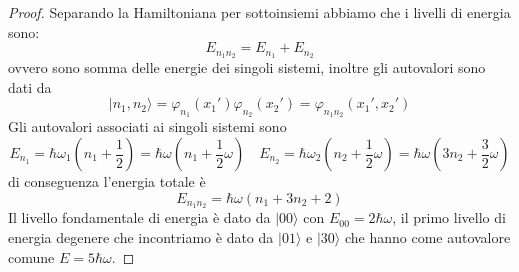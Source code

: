 \begin{proof}
Separando la Hamiltoniana per sottoinsiemi abbiamo che i livelli di energia sono:
\begin{equation*}
	E_{n_1n_2} = E_{n_1} + E_{n_2}
\end{equation*}
ovvero sono somma delle energie dei singoli sistemi, inoltre gli autovalori sono dati da
\begin{equation*}
	|n_1,n_2 \rangle = \varphi_{n_1}(x_1')\varphi_{n_2}(x_2') = \varphi_{n_1n_2}(x_1',x_2')
\end{equation*}
Gli autovalori associati ai singoli sistemi sono
\begin{equation*}
	E_{n_1} = \hbar \omega_1 \left(n_1 + \frac{1}{2}\right) = \hbar \omega \left (n_1 + \frac{1}{2}\omega \right) \quad E_{n_2}= \hbar \omega_2\left (n_2 + \frac{1}{2}\omega \right) = \hbar \omega \left (3n_2 + \frac{3}{2}\omega \right)
\end{equation*}
di conseguenza l'energia totale \`e 
\begin{equation*}
	E_{n_1n_2} = \hbar \omega(n_1 + 3n_2 +2)
\end{equation*}
Il livello fondamentale di energia \`e dato da $|00\rangle$ con $E_{00} = 2 \hbar \omega$, il primo livello di energia degenere che incontriamo \`e dato da $|01 \rangle $ e $|30 \rangle$ che hanno come autovalore comune $E = 5 \hbar \omega$.
\newline


\end{proof}
